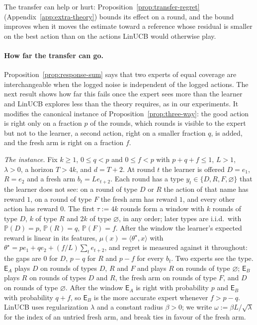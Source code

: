 \documentclass{article}
\theoremstyle{definition}
\theoremstyle{remark}
\newcommand{\Prb}{\mathbb{P}}
\theoremstyle{remark}
\newcommand{\Exp}{\mathsf{E}}
\begin{document}
The transfer can help or hurt: Proposition~\ref{prop:transfer-regret}
(Appendix~\ref{app:extra-theory}) bounds its effect on a round, and the bound improves when it moves the
estimate toward a reference whose residual is smaller on the best action than
on the actions LinUCB would otherwise play.

\paragraph{How far the transfer can go.}
Proposition~\ref{prop:response-sum} says that two experts of equal coverage
are interchangeable when the logged noise is independent of the logged
actions. The next result shows how far this fails once the expert sees more
than the learner and LinUCB explores less than the theory requires, as in our
experiments. It modifies the canonical instance of
Proposition~\ref{prop:three-way}: the good action is right only on a fraction
$p$ of the rounds, which rounds is visible to the expert but not to the
learner, a second action, right on a smaller fraction $q$, is added, and the
fresh arm is right on a fraction $f$.

\emph{The instance.} Fix $k\ge1$, $0\le q<p$ and $0\le f<p$ with $p+q+f\le1$,
$L>1$, $\lambda>0$, a horizon $T>4k$, and $d=T+2$. At round $t$ the learner is
offered $D=e_1$, $R=e_2$ and a fresh arm $b_t=Le_{t+2}$. Each round has a type
$y_t\in\{D,R,F,\varnothing\}$ that the learner does not see: on a round of
type $D$ or $R$ the action of that name has reward $1$, on a round of type $F$
the fresh arm has reward $1$, and every other action has reward $0$. The
first $\tau:=4k$ rounds form a window with $k$ rounds of type $D$, $k$ of type
$R$ and $2k$ of type $\varnothing$, in any order; later types are i.i.d.\ with
$\Prb(D)=p$, $\Prb(R)=q$, $\Prb(F)=f$. After the window the learner's expected
reward is linear in its features, $\mu(x)=\langle\theta^\star,x\rangle$ with
$\theta^\star=pe_1+qe_2+(f/L)\sum_{t}e_{t+2}$, and regret is measured against
it throughout: the gaps are $0$ for $D$, $p-q$ for $R$ and $p-f$ for every
$b_t$. Two experts see the type. $\Exp_A$ plays $D$ on rounds of types $D$,
$R$ and $F$ and plays $R$ on rounds of type $\varnothing$; $\Exp_B$ plays $R$
on rounds of types $D$ and $R$, the fresh arm on rounds of type $F$, and $D$
on rounds of type $\varnothing$. After the window $\Exp_A$ is right with
probability $p$ and $\Exp_B$ with probability $q+f$, so $\Exp_B$ is the more
accurate expert whenever $f>p-q$. LinUCB uses regularization $\lambda$ and a
constant radius $\beta>0$; we write $\omega:=\beta L/\sqrt\lambda$ for the
index of an untried fresh arm, and break ties in favour of the fresh arm.
\end{document}
